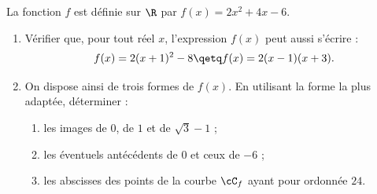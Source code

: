 \exo

La fonction $f$ est définie sur $\R$ par $f(x)=2x^2+4x-6$.
\begin{enumerate}
\item Vérifier que, pour tout réel $x$, l'expression $f(x)$ peut aussi s'écrire :
\[f(x)=2(x+1)^2-8\qetq f(x)=2(x-1)(x+3).\]
\item On dispose ainsi de trois formes de $f(x)$. En utilisant la forme la plus adaptée, déterminer :
\begin{enumerate}
\item les images de $0$, de $1$ et de $\sqrt{3}-1$ ;
\item les éventuels antécédents de $0$ et ceux de $-6$ ;
\item les abscisses des points de la courbe $\cC_f$ ayant pour ordonnée $24$.
\end{enumerate}
\end{enumerate}

